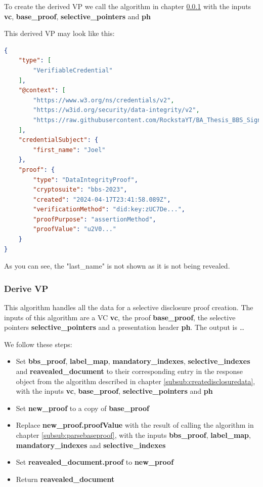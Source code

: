 \documentclass[
	a4paper               %
	,bibliography=totoc   %
	,listof=totoc         %
	,monolingual
	twoside=false,
]{bfhthesis}              %
\begin{document}
To create the derived VP we call the algorithm in chapter \ref{subsub:derivevp} with the inputs \textbf{vc}, \textbf{base\_proof}, \textbf{selective\_pointers} and \textbf{ph}

This derived VP may look like this:
\begin{lstlisting}[language=json,firstnumber=1,caption={Derived VP},captionpos=b]
{
	"type": [
		"VerifiableCredential"
	],
	"@context": [
		"https://www.w3.org/ns/credentials/v2",
		"https://w3id.org/security/data-integrity/v2",
		"https://raw.githubusercontent.com/RockstaYT/BA_Thesis_BBS_Signatures/docs/context/example_1.jsonld"
	],
	"credentialSubject": {
		"first_name": "Joel"
	},
	"proof": {
		"type": "DataIntegrityProof",
		"cryptosuite": "bbs-2023",
		"created": "2024-04-17T23:41:58.089Z",
		"verificationMethod": "did:key:zUC7De...",
		"proofPurpose": "assertionMethod",
		"proofValue": "u2V0..."
	}
}
\end{lstlisting}

As you can see, the "last\_name" is not shown as it is not being revealed.

\subsubsection{Derive VP}
\label{subsub:derivevp}

This algorithm handles all the data for a selective disclosure proof creation.
The inputs of this algorithm are a VC \textbf{vc}, the proof \textbf{base\_proof}, the selective pointers \textbf{selective\_pointers} and a presentation header \textbf{ph}.
The output is \dots

We follow these steps:
\begin{itemize}
	\item Set \textbf{bbs\_proof}, \textbf{label\_map}, \textbf{mandatory\_indexes}, \textbf{selective\_indexes} and \textbf{reavealed\_document} to their corresponding entry in the response object from the algorithm described in chapter \ref*{subsub:createdisclosuredata}, with the inputs \textbf{vc}, \textbf{base\_proof}, \textbf{selective\_pointers} and \textbf{ph}
	\item Set \textbf{new\_proof} to a copy of \textbf{base\_proof}
	\item Replace \textbf{new\_proof.proofValue} with the result of calling the algorithm in chapter \ref{subsub:parsebaseproof}, with the inputs \textbf{bbs\_proof}, \textbf{label\_map}, \textbf{mandatory\_indexes} and \textbf{selective\_indexes}
	\item Set \textbf{reavealed\_document.proof} to \textbf{new\_proof}
	\item Return \textbf{reavealed\_document}
\end{itemize}
\end{document}
